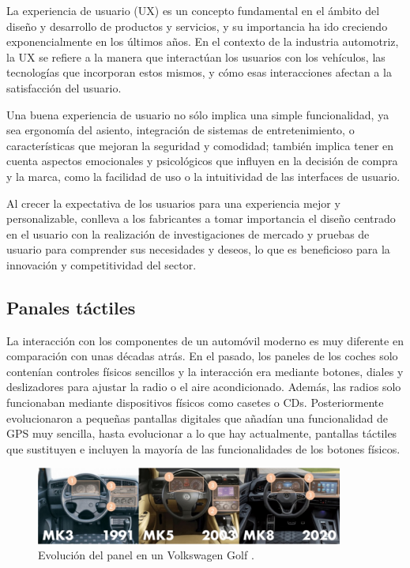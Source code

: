 \documentclass[12pt]{report} %
\begin{document}
La experiencia de usuario (UX) es un concepto fundamental en el ámbito del diseño y desarrollo de productos y servicios, y su importancia ha ido creciendo exponencialmente en los últimos años. En el contexto de la industria automotriz, la UX se refiere a la manera que interactúan los usuarios con los vehículos, las tecnologías que incorporan estos mismos, y cómo esas interacciones afectan a la satisfacción del usuario.
\cite{userExperience}

Una buena experiencia de usuario no sólo implica una simple funcionalidad, ya sea ergonomía del asiento, integración de sistemas de entretenimiento, o características que mejoran la seguridad y comodidad; también implica tener en cuenta aspectos emocionales y psicológicos que influyen en la decisión de compra y la marca, como la facilidad de uso o la intuitividad de las interfaces de usuario. 

Al crecer la expectativa de los usuarios para una experiencia mejor y personalizable, conlleva a los fabricantes a tomar importancia el diseño centrado en el usuario con la realización de investigaciones de mercado y pruebas de usuario para comprender sus necesidades y deseos, lo que es beneficioso para la innovación y competitividad del sector. 

\subsection{Panales táctiles}

La interacción con los componentes de un automóvil moderno es muy diferente en comparación con unas décadas atrás. En el pasado, los paneles de los coches solo contenían controles físicos sencillos y la interacción era mediante botones, diales y deslizadores para ajustar la radio o el aire acondicionado. Además, las radios solo funcionaban mediante dispositivos físicos como casetes o CDs. Posteriormente evolucionaron a pequeñas pantallas digitales que añadían una funcionalidad de GPS muy sencilla, hasta evolucionar a lo que hay actualmente, pantallas táctiles que sustituyen e incluyen la mayoría de las funcionalidades de los botones físicos.
\cite{touchScreen}

\begin{figure}[h]
    \centering
    \includegraphics[width=0.9\textwidth]{evolutionTouchscreen.png}
    \caption{Evolución del panel en un Volkswagen Golf \cite{userExperience}.}
    \label{fig:imagen1}
\end{figure}
\end{document}

